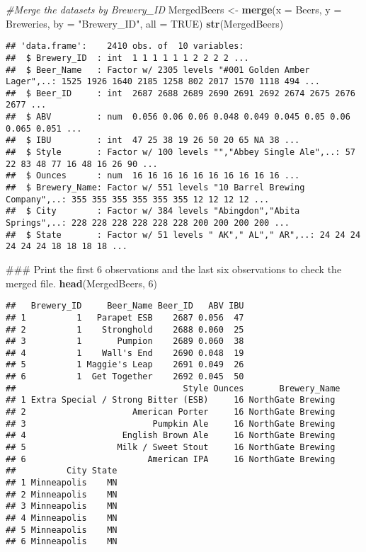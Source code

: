 \documentclass[]{article}
\newenvironment{Shaded}{\begin{snugshade}}{\end{snugshade}}
\newcommand{\KeywordTok}[1]{\textcolor[rgb]{0.13,0.29,0.53}{\textbf{{#1}}}}
\newcommand{\DataTypeTok}[1]{\textcolor[rgb]{0.13,0.29,0.53}{{#1}}}
\newcommand{\DecValTok}[1]{\textcolor[rgb]{0.00,0.00,0.81}{{#1}}}
\newcommand{\StringTok}[1]{\textcolor[rgb]{0.31,0.60,0.02}{{#1}}}
\newcommand{\CommentTok}[1]{\textcolor[rgb]{0.56,0.35,0.01}{\textit{{#1}}}}
\newcommand{\OtherTok}[1]{\textcolor[rgb]{0.56,0.35,0.01}{{#1}}}
\newcommand{\NormalTok}[1]{{#1}}
\begin{document}
\begin{Shaded}
\begin{Highlighting}[]
\CommentTok{#Merge the datasets by Brewery_ID}
\NormalTok{MergedBeers <-}\StringTok{ }\KeywordTok{merge}\NormalTok{(}\DataTypeTok{x =} \NormalTok{Beers, }\DataTypeTok{y =} \NormalTok{Breweries, }\DataTypeTok{by =} \StringTok{"Brewery_ID"}\NormalTok{, }\DataTypeTok{all =} \OtherTok{TRUE}\NormalTok{)}
\KeywordTok{str}\NormalTok{(MergedBeers)}
\end{Highlighting}
\end{Shaded}

\begin{verbatim}
## 'data.frame':    2410 obs. of  10 variables:
##  $ Brewery_ID  : int  1 1 1 1 1 1 2 2 2 2 ...
##  $ Beer_Name   : Factor w/ 2305 levels "#001 Golden Amber Lager",..: 1525 1926 1640 2185 1258 802 2017 1570 1118 494 ...
##  $ Beer_ID     : int  2687 2688 2689 2690 2691 2692 2674 2675 2676 2677 ...
##  $ ABV         : num  0.056 0.06 0.06 0.048 0.049 0.045 0.05 0.06 0.065 0.051 ...
##  $ IBU         : int  47 25 38 19 26 50 20 65 NA 38 ...
##  $ Style       : Factor w/ 100 levels "","Abbey Single Ale",..: 57 22 83 48 77 16 48 16 26 90 ...
##  $ Ounces      : num  16 16 16 16 16 16 16 16 16 16 ...
##  $ Brewery_Name: Factor w/ 551 levels "10 Barrel Brewing Company",..: 355 355 355 355 355 355 12 12 12 12 ...
##  $ City        : Factor w/ 384 levels "Abingdon","Abita Springs",..: 228 228 228 228 228 228 200 200 200 200 ...
##  $ State       : Factor w/ 51 levels " AK"," AL"," AR",..: 24 24 24 24 24 24 18 18 18 18 ...
\end{verbatim}

\begin{Shaded}
\begin{Highlighting}[]
\NormalTok{### Print the first 6 observations and the last six observations to check the merged file.}
\KeywordTok{head}\NormalTok{(MergedBeers, }\DecValTok{6}\NormalTok{)}
\end{Highlighting}
\end{Shaded}

\begin{verbatim}
##   Brewery_ID     Beer_Name Beer_ID   ABV IBU
## 1          1   Parapet ESB    2687 0.056  47
## 2          1    Stronghold    2688 0.060  25
## 3          1       Pumpion    2689 0.060  38
## 4          1    Wall's End    2690 0.048  19
## 5          1 Maggie's Leap    2691 0.049  26
## 6          1  Get Together    2692 0.045  50
##                                 Style Ounces       Brewery_Name
## 1 Extra Special / Strong Bitter (ESB)     16 NorthGate Brewing 
## 2                     American Porter     16 NorthGate Brewing 
## 3                         Pumpkin Ale     16 NorthGate Brewing 
## 4                   English Brown Ale     16 NorthGate Brewing 
## 5                  Milk / Sweet Stout     16 NorthGate Brewing 
## 6                        American IPA     16 NorthGate Brewing 
##          City State
## 1 Minneapolis    MN
## 2 Minneapolis    MN
## 3 Minneapolis    MN
## 4 Minneapolis    MN
## 5 Minneapolis    MN
## 6 Minneapolis    MN
\end{verbatim}
\end{document}
